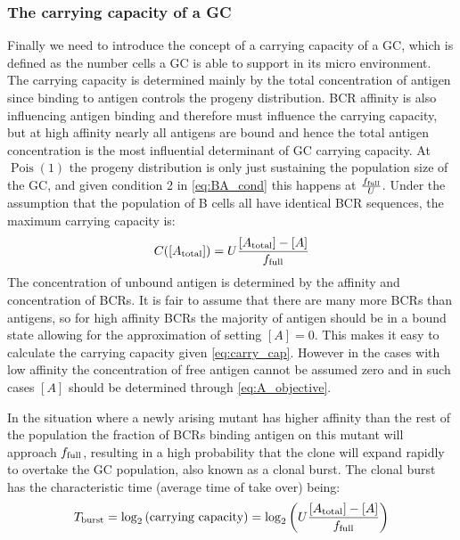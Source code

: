 \subsubsection{The carrying capacity of a GC}
Finally we need to introduce the concept of a carrying capacity of a GC, which is defined as the number cells a GC is able to support in its micro environment.
The carrying capacity is determined mainly by the total concentration of antigen since binding to antigen controls the progeny distribution.
BCR affinity is also influencing antigen binding and therefore must influence the carrying capacity, but at high affinity nearly all antigens are bound and hence the total antigen concentration is the most influential determinant of GC carrying capacity.
At $\operatorname{Pois}(1)$ the progeny distribution is only just sustaining the population size of the GC, and given condition 2 in \eqref{eq:BA_cond} this happens at $\frac{f_{\text{full}}}{U}$.
Under the assumption that the population of B cells all have identical BCR sequences, the maximum carrying capacity is:
\begin{equation}
C([A_{\text{total}}]) = U \frac{[A_{\text{total}}] - [A]}{f_{\text{full}}}
  \label{eq:carry_cap}
\end{equation}
The concentration of unbound antigen is determined by the affinity and concentration of BCRs.
It is fair to assume that there are many more BCRs than antigens, so for high affinity BCRs the majority of antigen should be in a bound state allowing for the approximation of setting $[A]=0$.
This makes it easy to calculate the carrying capacity given \eqref{eq:carry_cap}.
However in the cases with low affinity the concentration of free antigen cannot be assumed zero and in such cases $[A]$ should be determined through \eqref{eq:A_objective}.

In the situation where a newly arising mutant has higher affinity than the rest of the population the fraction of BCRs binding antigen on this mutant will approach $f_{\text{full}}$, resulting in a high probability that the clone will expand rapidly to overtake the GC population, also known as a clonal burst.
The clonal burst has the characteristic time (average time of take over) being:
$$
T_{\text{burst}} = \log_2 \left(\text{carrying capacity} \right) = \log_2\left( U \frac{[A_{\text{total}}] - [A]}{f_{\text{full}}} \right)
$$






